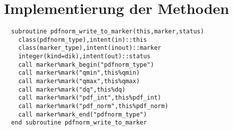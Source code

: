 \section{Implementierung der Methoden}
\begin{Verbatim}
  subroutine pdfnorm_write_to_marker(this,marker,status)
    class(pdfnorm_type),intent(in)::this
    class(marker_type),intent(inout)::marker
    integer(kind=dik),intent(out)::status
    call marker%mark_begin("pdfnorm_type")
    call marker%mark("qmin",this%qmin)
    call marker%mark("qmax",this%qmax)
    call marker%mark("dq",this%dq)
    call marker%mark("pdf_int",this%pdf_int)
    call marker%mark("pdf_norm",this%pdf_norm)
    call marker%mark_end("pdfnorm_type")
  end subroutine pdfnorm_write_to_marker
\end{Verbatim}

